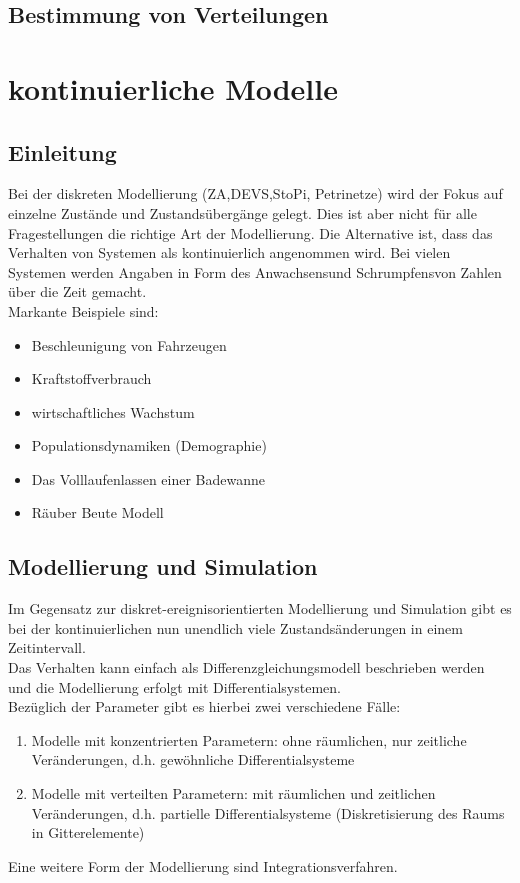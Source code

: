 \documentclass[11pt, fleqn, a4paper, leqno]{scrartcl} %
\begin{document}
	\subsection{Bestimmung von Verteilungen}	
\section{kontinuierliche Modelle}
	\subsection{Einleitung}
		Bei der diskreten Modellierung (ZA,DEVS,StoPi, Petrinetze) wird der Fokus auf einzelne Zustände und Zustandsübergänge gelegt. Dies ist aber nicht für alle Fragestellungen die richtige Art der Modellierung. Die Alternative ist, dass das Verhalten von Systemen als kontinuierlich angenommen wird. Bei vielen Systemen werden Angaben in Form des \glqq Anwachsens\grqq und \glqq Schrumpfens\grqq von Zahlen über die Zeit gemacht.\\
		Markante Beispiele sind:
		\begin{itemize}
			\item Beschleunigung von Fahrzeugen
			\item Kraftstoffverbrauch
			\item wirtschaftliches Wachstum
			\item Populationsdynamiken (Demographie)
			\item Das Volllaufenlassen einer Badewanne
			\item Räuber Beute Modell
		\end{itemize}
	\subsection{Modellierung und Simulation}
		Im Gegensatz zur diskret-ereignisorientierten Modellierung und Simulation gibt es bei der kontinuierlichen nun unendlich viele Zustandsänderungen in einem Zeitintervall.\\
		Das Verhalten kann einfach als Differenzgleichungsmodell beschrieben werden und die Modellierung erfolgt mit Differentialsystemen.\\
		Bezüglich der Parameter gibt es hierbei zwei verschiedene Fälle:
			\begin{enumerate}
				\item Modelle mit konzentrierten Parametern: ohne räumlichen, nur zeitliche Veränderungen, d.h. gewöhnliche Differentialsysteme
				\item Modelle mit verteilten Parametern: mit räumlichen und zeitlichen Veränderungen, d.h. partielle Differentialsysteme (Diskretisierung des Raums in Gitterelemente)
			\end{enumerate}
		Eine weitere Form der Modellierung sind Integrationsverfahren.
\end{document}
